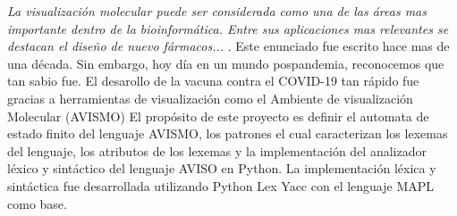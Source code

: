 \textit{La visualización molecular puede ser considerada como una de las áreas mas importante dentro de la bioinformática. Entre sus aplicaciones mas relevantes se destacan el diseño de nuevo fármacos...} \cite{narciso_farias_gramatica_2012}.
Este enunciado fue escrito hace mas de una década. Sin embargo, hoy día en un mundo pospandemia, reconocemos que tan sabio fue.
El desarollo de la vacuna contra el COVID-19 tan rápido fue gracias a herramientas de visualización como el Ambiente de visualización Molecular (AVISMO) \cite{narciso_farias_gramatica_2012}
El propósito de este proyecto es definir el automata de estado finito del lenguaje AVISMO, los patrones el cual caracterizan los lexemas del lenguaje, los atributos de los lexemas y la implementación del analizador léxico y sintáctico del lenguaje AVISO en Python.
La implementación léxica y sintáctica fue desarrollada utilizando Python Lex Yacc \cite{noauthor_ply_nodate} con el lenguaje MAPL \cite{noauthor_pl-project-lgm-yvv-amnmapl_nodate} como base.
